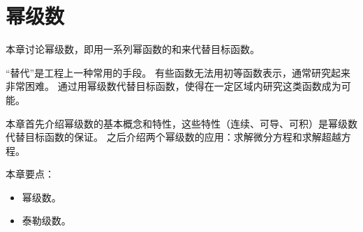 \chapter{幂级数}

本章讨论幂级数，即用一系列幂函数的和来代替目标函数。

“替代”是工程上一种常用的手段。
有些函数无法用初等函数表示，通常研究起来非常困难。
通过用幂级数代替目标函数，使得在一定区域内研究这类函数成为可能。

本章首先介绍幂级数的基本概念和特性，这些特性（连续、可导、可积）是幂级数代替目标函数的保证。
之后介绍两个幂级数的应用：求解微分方程和求解超越方程。

本章要点：
\begin{itemize}
    \item 幂级数。
    \item 泰勒级数。
\end{itemize}

~

\newpage


\newpage


\newpage





